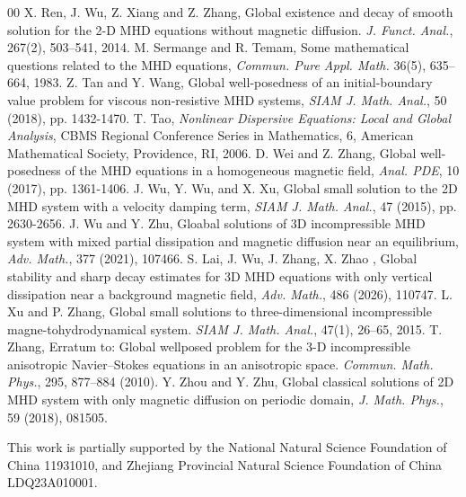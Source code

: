 \documentclass[11pt]{amsart}
\theoremstyle{definition}
\numberwithin{equation}{section}
\begin{document}
\begin{thebibliography}{00}
	 X. Ren,  J. Wu,  Z. Xiang and  Z. Zhang, Global existence and decay of smooth solution for the 2-D MHD equations without magnetic diffusion. {\it J. Funct. Anal.},  267(2), 503–541,
	2014.
	 M. Sermange and  R. Temam, Some mathematical questions related to the MHD equations, {\it Commun. Pure Appl. Math.} 36(5), 635–664, 1983.
	 Z. Tan and Y. Wang, Global well-posedness of an initial-boundary value problem for viscous
	non-resistive MHD systems, {\it SIAM J. Math. Anal.}, 50 (2018), pp. 1432-1470.
	T. Tao, {\it Nonlinear Dispersive Equations: Local and Global Analysis}, CBMS Regional Conference Series in Mathematics, 6, American Mathematical Society, Providence, RI, 2006.
	D. Wei and Z. Zhang, Global well-posedness of the MHD equations in a homogeneous magnetic
	field, {\it Anal. PDE}, 10 (2017), pp. 1361-1406.
	J. Wu, Y. Wu, and X. Xu, Global small solution to the 2D MHD system with a velocity damping term, {\it SIAM J. Math. Anal.}, 47 (2015), pp. 2630-2656.
	J. Wu and Y. Zhu, Gloabal solutions of 3D incompressible MHD system with mixed partial dissipation and magnetic diffusion near an equilibrium, {\it Adv. Math.}, 377 (2021), 107466.
	S. Lai, J. Wu, J. Zhang, X. Zhao , Global stability and sharp decay estimates for 3D
	MHD equations with only vertical dissipation near a background magnetic field, {\it Adv. Math.}, 486 (2026), 110747.
	L. Xu and P. Zhang, Global small solutions to three-dimensional incompressible magne-tohydrodynamical system. {\it SIAM J. Math. Anal.},  47(1), 26–65, 2015.
	T. Zhang,  Erratum to: Global wellposed problem for the 3-D incompressible anisotropic Navier–Stokes equations in an anisotropic space. {\it Commun. Math. Phys.}, 295, 877–884 (2010).
	Y. Zhou and Y. Zhu, Global classical solutions of 2D MHD system with only magnetic diffusion on periodic domain, {\it J. Math. Phys.}, 59 (2018), 081505.
	
	
\end{thebibliography}


This work is partially supported by the National Natural Science Foundation of China  11931010, and Zhejiang Provincial Natural Science Foundation of China LDQ23A010001.


\medskip
\end{document}
